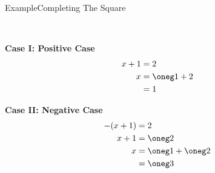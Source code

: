 \documentclass[\string~/GitHub/sthlmNordBeamerTheme/sthlmNordLightDemo.tex]{subfiles}
\begin{document}
\begin{frame}{Example}{Completing The Square}
	\framebreak

	\hfill\\
	\begin{minipage}[t]{0.45\textwidth}
		\vspace{0pt}
		\textbf{Case I: Positive Case}
		\begin{align*}
			x + 1 & = 2           \\
			x     & = \oneg 1 + 2 \\
			      & = 1
		\end{align*}
	\end{minipage}
	\hspace{0.05\textwidth}
	\begin{minipage}[t]{0.45\textwidth}
		\vspace{0pt}
		\textbf{Case II: Negative Case}
		\begin{align*}
			-(x + 1) & = 2                 \\
			x + 1    & = \oneg 2           \\
			x        & = \oneg 1 + \oneg 2 \\
			         & = \oneg 3
		\end{align*}

	\end{minipage}
	\hfill
\end{frame}
\end{document}
